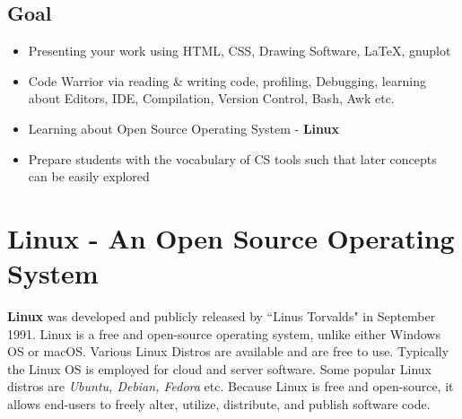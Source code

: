 \documentclass[12pt]{article}
\begin{document}
\subsection{Goal}
\begin{itemize}
    \item Presenting your work using HTML, CSS, Drawing Software, \LaTeX, gnuplot
    \item Code Warrior via reading \& writing code, profiling, Debugging, learning about Editors, IDE, Compilation, Version Control, Bash, Awk etc.
    \item Learning about Open Source Operating System - \textbf{Linux}
    \item Prepare students with the vocabulary of CS tools such that later concepts can be easily explored
\end{itemize}

\newpage

\section{Linux - An Open Source Operating System}
\textbf{Linux}\cite{Linux:1} was developed and publicly released by ``Linus Torvalds" in September 1991. Linux is a free and open-source operating system, unlike either Windows OS or macOS. Various Linux Distros are available and are free to use. Typically the Linux OS is employed for cloud and server software. Some popular Linux distros are \textit{Ubuntu, Debian, Fedora} etc. Because Linux is free and open-source, it allows end-users to freely alter, utilize, distribute, and publish software code. \\
\end{document}
